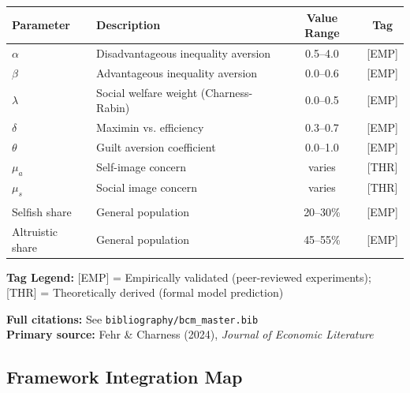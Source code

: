 \begin{tcolorbox}[colback=blue!5!white, colframe=blue!75!black,
    title=\textbf{Epistemic Status: Key Parameters}]

\renewcommand{\arraystretch}{1.3}
\begin{tabular}{@{}llcc@{}}
\toprule
\textbf{Parameter} & \textbf{Description} & \textbf{Value Range} & \textbf{Tag} \\
\midrule
$\alpha$ & Disadvantageous inequality aversion & 0.5--4.0 & [EMP] \\
$\beta$ & Advantageous inequality aversion & 0.0--0.6 & [EMP] \\
$\lambda$ & Social welfare weight (Charness-Rabin) & 0.0--0.5 & [EMP] \\
$\delta$ & Maximin vs. efficiency & 0.3--0.7 & [EMP] \\
$\theta$ & Guilt aversion coefficient & 0.0--1.0 & [EMP] \\
$\mu_a$ & Self-image concern & varies & [THR] \\
$\mu_s$ & Social image concern & varies & [THR] \\
\addlinespace
\multicolumn{4}{@{}l}{\textit{Population shares:}} \\
Selfish share & General population & 20--30\% & [EMP] \\
Altruistic share & General population & 45--55\% & [EMP] \\
\bottomrule
\end{tabular}

\vspace{0.5em}
\textbf{Tag Legend:} [EMP] = Empirically validated (peer-reviewed experiments);
[THR] = Theoretically derived (formal model prediction)

\end{tcolorbox}

\noindent\textbf{Full citations:} See \texttt{bibliography/bcm\_master.bib} \\
\textbf{Primary source:} Fehr \& Charness (2024), \textit{Journal of Economic Literature}

\vspace{1em}

\subsection{Framework Integration Map}

